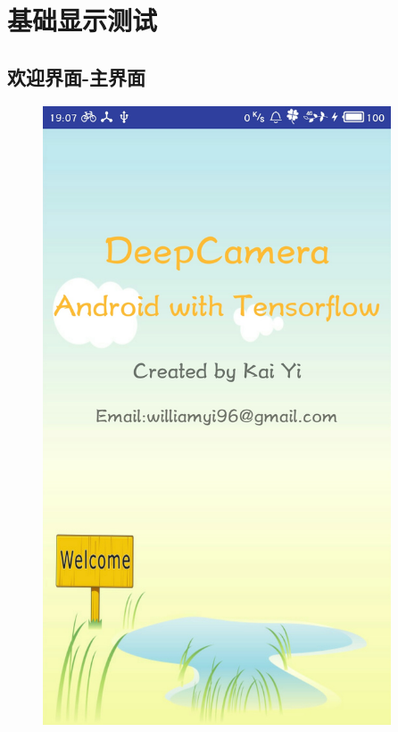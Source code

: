 \documentclass[UTF8, Microsoft YaHei]{book}
\begin{document}
    \section{基础显示测试}
    \subsection{欢迎界面-主界面}
    \begin{figure}[!htb]
    \centering
    \begin{minipage}[c]{0.5\textwidth}
    \centering
    \includegraphics[width=0.92\textwidth]{img/欢迎界面.png}
    \end{minipage}%

\end{figure}
\end{document}
